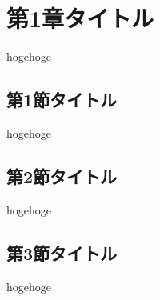\chapter{第1章タイトル}
hogehoge

  \section{第1節タイトル}
  hogehoge

  \section{第2節タイトル}
  hogehoge

  \section{第3節タイトル}
  hogehoge
